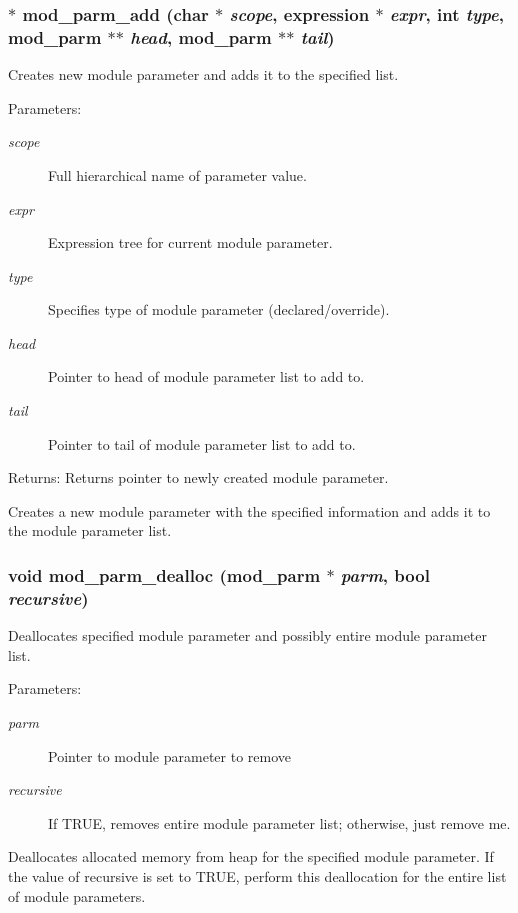 \subsubsection{$\ast$ mod\_\-parm\_\-add (char $\ast$ {\em scope}, {\bf expression} $\ast$ {\em expr}, int {\em type}, {\bf mod\_\-parm} $\ast$$\ast$ {\em head}, {\bf mod\_\-parm} $\ast$$\ast$ {\em tail})}\label{param_8h_a2}


Creates new module parameter and adds it to the specified list.

\begin{Desc}
\item[Parameters:]
\begin{description}
\item[{\em scope}]Full hierarchical name of parameter value. \item[{\em expr}]Expression tree for current module parameter. \item[{\em type}]Specifies type of module parameter (declared/override). \item[{\em head}]Pointer to head of module parameter list to add to. \item[{\em tail}]Pointer to tail of module parameter list to add to.\end{description}
\end{Desc}
\begin{Desc}
\item[Returns:]Returns pointer to newly created module parameter.\end{Desc}
Creates a new module parameter with the specified information and adds it to the module parameter list. 
\subsubsection{\setlength{\rightskip}{0pt plus 5cm}void mod\_\-parm\_\-dealloc ({\bf mod\_\-parm} $\ast$ {\em parm}, {\bf bool} {\em recursive})}\label{param_8h_a12}


Deallocates specified module parameter and possibly entire module parameter list.

\begin{Desc}
\item[Parameters:]
\begin{description}
\item[{\em parm}]Pointer to module parameter to remove \item[{\em recursive}]If TRUE, removes entire module parameter list; otherwise, just remove me.\end{description}
\end{Desc}
Deallocates allocated memory from heap for the specified module parameter. If the value of recursive is set to TRUE, perform this deallocation for the entire list of module parameters. 
